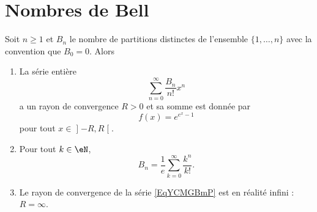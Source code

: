 
\section{Nombres de Bell}

\begin{theorem}  \label{ThoYFAzwSg}
    Soit \( n\geq 1\) et \( B_n\) le nombre de partitions distinctes de l'ensemble \( \{ 1,\ldots, n \}\) avec la convention que \( B_0=0\). Alors
    \begin{enumerate}
        \item
            La série entière
            \begin{equation}    \label{EqYCMGBmP}
                \sum_{n=0}^{\infty}\frac{ B_n }{ n! }x^n
            \end{equation}
            a un rayon de convergence \( R>0\) et sa somme est donnée par
            \begin{equation}
                f(x)= e^{ e^{x}-1}
            \end{equation}
            pour tout \( x\in\mathopen] -R , R \mathclose[\).
        \item
            Pour tout \( k\in \eN\),
            \begin{equation}
                B_n=\frac{1}{ e }\sum_{k=0}^{\infty}\frac{ k^n }{ k! }.
            \end{equation}
            \item
                Le rayon de convergence de la série \eqref{EqYCMGBmP} est en réalité infini : \( R=\infty\).
    \end{enumerate}
\end{theorem}


